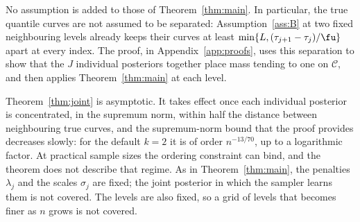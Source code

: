 No assumption is added to those of Theorem~\ref{thm:main}. In particular, the true quantile curves are not assumed to be separated: Assumption~\ref{ass:B} at two fixed neighbouring levels already keeps their curves at least $\min\{L,(\tau_{j+1}-\tau_j)/\fu\}$ apart at every index. The proof, in Appendix~\ref{app:proofs}, uses this separation to show that the $J$ individual posteriors together place mass tending to one on $\mathcal C$, and then applies Theorem~\ref{thm:main} at each level.

\begin{remark}[Scope]
Theorem~\ref{thm:joint} is asymptotic. It takes effect once each individual posterior is concentrated, in the supremum norm, within half the distance between neighbouring true curves, and the supremum-norm bound that the proof provides decreases slowly: for the default $k=2$ it is of order $n^{-13/70}$, up to a logarithmic factor. At practical sample sizes the ordering constraint can bind, and the theorem does not describe that regime. As in Theorem~\ref{thm:main}, the penalties $\lambda_j$ and the scales $\sigma_j$ are fixed; the joint posterior in which the sampler learns them is not covered. The levels are also fixed, so a grid of levels that becomes finer as $n$ grows is not covered.
\end{remark}
